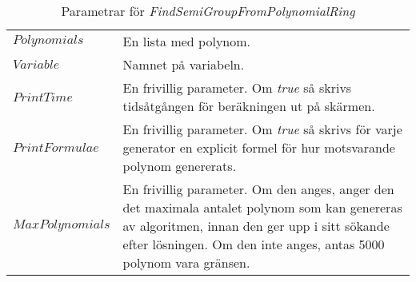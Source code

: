 \begin{table}[h]
\caption{Parametrar för \emph{FindSemiGroupFromPolynomialRing}}
\begin{center}
\begin{tabular}{|l|p{9cm}|}
\hline
$Polynomials$ & En lista med polynom.\\
$Variable$ & Namnet på variabeln.\\
$PrintTime$ & En frivillig parameter. Om \emph{true} så skrivs tidsåtgången för beräkningen ut på skärmen.\\
$PrintFormulae$ & En frivillig parameter. Om \emph{true} så skrivs för varje generator en explicit formel för hur motsvarande polynom genererats.\\
$MaxPolynomials$ & En frivillig parameter. Om den anges, anger den det maximala antalet polynom som kan genereras av algoritmen, innan den ger upp i sitt sökande efter lösningen. Om den inte anges, antas 5000 polynom vara gränsen.\\
\hline
\end{tabular}
\end{center}
\end{table}

